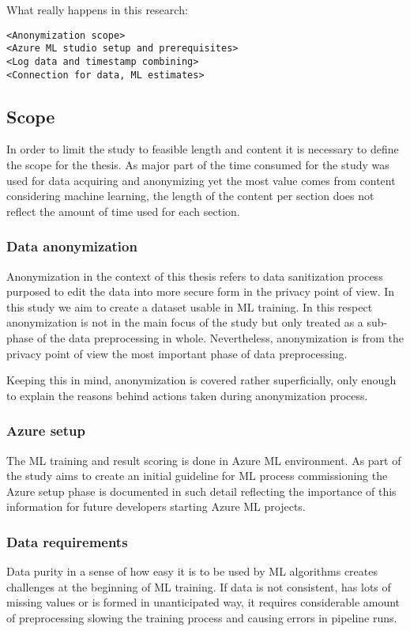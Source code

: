\documentclass[english, 12pt, a4paper, elec, utf8, a-1b, online]{aaltothesis}
\begin{document}
What really happens in this research:
\begin{verbatim}
<Anonymization scope>
<Azure ML studio setup and prerequisites>
<Log data and timestamp combining>
<Connection for data, ML estimates>
\end{verbatim}

\subsection{Scope}\label{subsec:scope}

In order to limit the study
to feasible length and content
it is necessary to define the scope for the thesis.
As major part of the time consumed for the study
was used for data acquiring and anonymizing
yet the most value comes from
content considering machine learning,
the length of the content per section
does not reflect
the amount of time used for each section.

\subsubsection*{Data anonymization}
Anonymization in the context of this thesis
refers to data sanitization process
purposed to edit the data into
more secure form in the privacy point of view.
In this study we aim to
create a dataset usable in ML training.
In this respect
anonymization is not in the main focus of the study
but only treated as a sub-phase
of the data preprocessing in whole.
Nevertheless,
anonymization is from the privacy point of view
the most important phase of data preprocessing.

Keeping this in mind,
anonymization is covered rather superficially,
only enough to explain the reasons
behind actions taken during anonymization process.

\subsubsection*{Azure setup}
The ML training and result scoring
is done in Azure ML environment.
As part of the study aims to create
an initial guideline for
ML process commissioning
the Azure setup phase is documented in such detail
reflecting the importance of this information
for future developers
starting Azure ML projects.


\subsubsection*{Data requirements}
Data purity in a sense of
how easy it is to be used by ML algorithms
creates challenges at the beginning of ML training.
If data is not consistent,
has lots of missing values
or is formed in unanticipated way,
it requires considerable amount of preprocessing
slowing the training process
and causing errors in pipeline runs.
\end{document}
